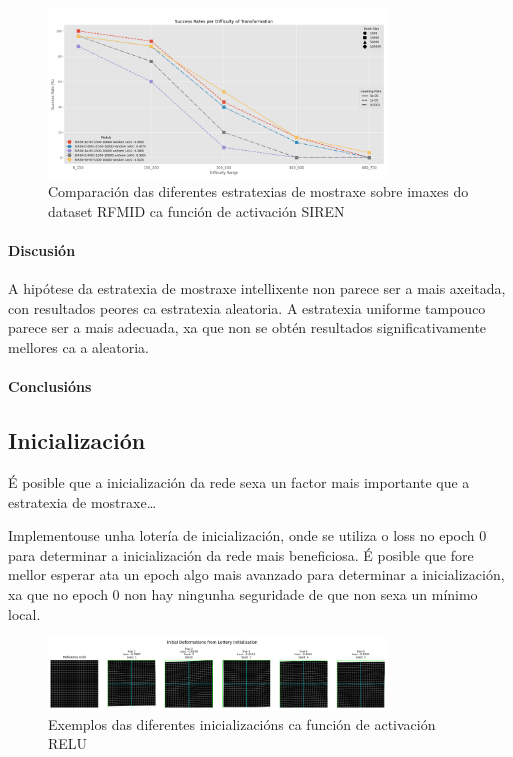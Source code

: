 \begin{figure}[ht]
    \centering
    \includegraphics[width=0.8\textwidth]{imaxes/muestraje/experiment_plot_RFMID_SIREN_RvsU.png}
    \caption{Comparación das diferentes estratexias de mostraxe sobre imaxes do dataset RFMID ca función de activación SIREN}
    \label{fig:sampling_comparison_SIREN}
\end{figure}



\paragraph{Discusión}
\label{par:Discusión}

A hipótese da estratexia de mostraxe intellixente non parece ser a mais axeitada, con resultados peores ca estratexia aleatoria. 
A estratexia uniforme tampouco parece ser a mais adecuada, xa que non se obtén resultados significativamente mellores ca a aleatoria.


\paragraph{Conclusións}
\label{par:Conclusións}

\subsection{Inicialización}
\label{subsec:Inicialización}

É posible que a inicialización da rede sexa un factor mais importante que a estratexia de mostraxe\dots

Implementouse unha lotería de inicialización, onde se utiliza o loss no epoch 0 para determinar a inicialización da rede mais beneficiosa.
É posible que fore mellor esperar ata un epoch algo mais avanzado para determinar a inicialización, xa que no epoch 0 non hay ningunha seguridade de que non sexa un mínimo local.

\begin{figure}[ht]
    \centering
    \includegraphics[width=0.8\textwidth]{imaxes/lottery/initial_deformations_combinedMLP.png}
    \caption{Exemplos das diferentes inicializacións ca función de activación RELU}
    \label{fig:lottery_initial_deformations_combinedMLP}
\end{figure}

